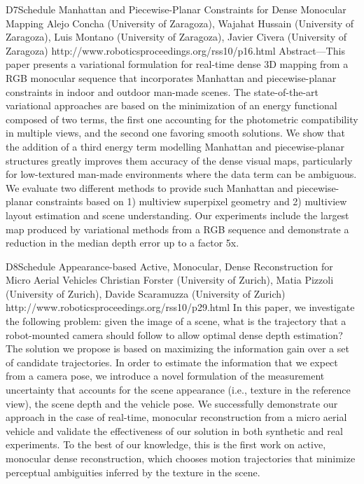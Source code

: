 \begin{spacing}{1.0}
\descriptionPaper
{D7}{Schedule}
{	
Manhattan and Piecewise-Planar Constraints for Dense Monocular Mapping 
}
{
Alejo Concha (University of Zaragoza), Wajahat Hussain (University of Zaragoza), Luis Montano (University of Zaragoza), Javier Civera (University of Zaragoza)
}
{
http://www.roboticsproceedings.org/rss10/p16.html
}
{
Abstract—This paper presents a variational formulation for real-time dense 3D mapping from a RGB monocular sequence that incorporates Manhattan and piecewise-planar constraints in indoor and outdoor man-made scenes. The state-of-the-art variational approaches are based on the minimization of an energy functional composed of two terms, the first one accounting for the photometric compatibility in multiple views, and the second one favoring smooth solutions. We show that the addition of a third energy term modelling Manhattan and piecewise-planar structures greatly improves them accuracy of the dense visual maps, particularly for low-textured man-made environments where the data term can be ambiguous. We evaluate two different methods to provide such Manhattan and piecewise-planar constraints based on 1) multiview superpixel geometry and 2) multiview layout estimation and scene understanding. Our experiments include the largest map produced by variational methods from a RGB sequence and demonstrate a reduction in the median depth error up to a factor 5x.
}




\descriptionPaper
{D8}{Schedule}
{	
Appearance-based Active, Monocular, Dense Reconstruction for Micro Aerial Vehicles 
}
{
Christian Forster (University of Zurich), Matia Pizzoli (University of Zurich), Davide Scaramuzza (University of Zurich)
}
{
http://www.roboticsproceedings.org/rss10/p29.html
}
{
In this paper, we investigate the following problem: given the image of a scene, what is the trajectory that a robot-mounted camera should follow to allow optimal dense depth estimation? The solution we propose is based on maximizing the information gain over a set of candidate trajectories. In order to estimate the information that we expect from a camera pose, we introduce a novel formulation of the measurement uncertainty that accounts for the scene appearance (i.e., texture in the reference view), the scene depth and the vehicle pose. We successfully demonstrate our approach in the case of real-time, monocular reconstruction from a micro aerial vehicle and validate the effectiveness of our solution in both synthetic and real experiments. To the best of our knowledge, this is the first work on active, monocular dense reconstruction, which chooses motion trajectories that minimize perceptual ambiguities inferred by the texture in the scene.
}




\end{spacing}
